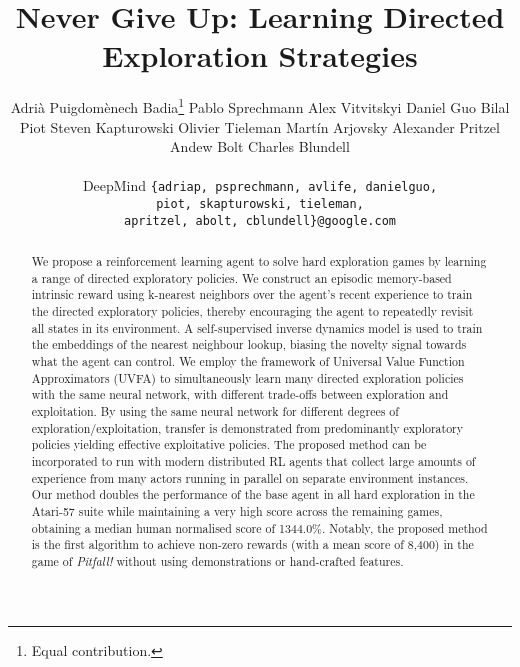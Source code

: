 \documentclass{article} \usepackage{iclr2020_conference,times}
\title{Never Give Up: Learning Directed \\Exploration Strategies}
\author{Adri\`a Puigdom\`enech Badia\thanks{Equal contribution.} \quad
  Pablo Sprechmann\footnotemark[1] \quad
  Alex Vitvitskyi\quad
  Daniel Guo\And
  Bilal Piot\quad
  Steven Kapturowski\quad
  Olivier Tieleman\quad
  Mart\'in Arjovsky \And
  Alexander Pritzel \quad
  Andew Bolt\quad
  Charles Blundell \\ \\
  DeepMind
  \texttt{\{adriap, psprechmann, avlife, danielguo,} \\
  \quad \quad \quad \quad \quad \texttt{piot, skapturowski, tieleman,} \\
  \quad \quad \quad \quad \quad \texttt{apritzel, abolt, cblundell\}@google.com} \\
}
\begin{document}
\maketitle

\begin{abstract}
We propose a reinforcement learning agent to solve hard exploration games by learning a range of directed exploratory policies. We construct an episodic memory-based intrinsic reward using k-nearest neighbors over the agent's recent experience to train the directed exploratory policies, thereby encouraging the agent to repeatedly revisit all states in its environment.
A self-supervised inverse dynamics model is used to train the embeddings of the nearest neighbour lookup, biasing the novelty signal towards what the agent can control. We employ the framework of Universal Value Function Approximators (UVFA) to simultaneously learn many directed exploration policies with the same neural network, with different trade-offs between exploration and exploitation.
By using the same neural network for different degrees of exploration/exploitation, transfer is demonstrated from predominantly exploratory policies yielding effective exploitative policies.
The proposed method can be incorporated to run with modern distributed RL agents that collect large amounts of experience from many actors running in parallel on separate environment instances.
Our method doubles the performance of the base agent in all hard exploration in the Atari-57 suite while maintaining a very high score across the remaining games, obtaining a median human normalised score of 1344.0\%. Notably, the proposed method is the first algorithm to achieve non-zero rewards (with a mean score of 8,400) in the game of \textit{Pitfall!} without using demonstrations or hand-crafted features.
\end{abstract}
\end{document}

